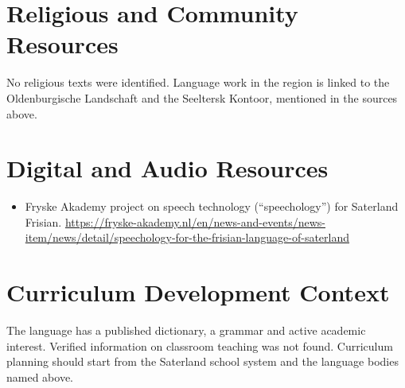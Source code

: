 \documentclass[12pt]{article}
\begin{document}
\section{Religious and Community Resources}
No religious texts were identified. Language work in the region is linked to the Oldenburgische Landschaft and the Seeltersk Kontoor, mentioned in the sources above.

\section{Digital and Audio Resources}
\begin{itemize}
\item Fryske Akademy project on speech technology (``speechology'') for Saterland Frisian. \url{https://fryske-akademy.nl/en/news-and-events/news-item/news/detail/speechology-for-the-frisian-language-of-saterland}
\end{itemize}

\section{Curriculum Development Context}
The language has a published dictionary, a grammar and active academic interest. Verified information on classroom teaching was not found. Curriculum planning should start from the Saterland school system and the language bodies named above.
\end{document}
